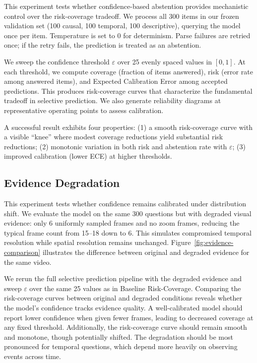 \documentclass{article}
\begin{document}
This experiment tests whether confidence-based abstention provides mechanistic control over the risk-coverage tradeoff. We process all 300 items in our frozen validation set (100 causal, 100 temporal, 100 descriptive), querying the model once per item. Temperature is set to 0 for determinism. Parse failures are retried once; if the retry fails, the prediction is treated as an abstention.

We sweep the confidence threshold $\varepsilon$ over 25 evenly spaced values in $[0, 1]$. At each threshold, we compute coverage (fraction of items answered), risk (error rate among answered items), and Expected Calibration Error among accepted predictions. This produces risk-coverage curves that characterize the fundamental tradeoff in selective prediction. We also generate reliability diagrams at representative operating points to assess calibration.

A successful result exhibits four properties: (1) a smooth risk-coverage curve with a visible ``knee'' where modest coverage reductions yield substantial risk reductions; (2) monotonic variation in both risk and abstention rate with $\varepsilon$; (3) improved calibration (lower ECE) at higher thresholds.

\subsection{Evidence Degradation}

This experiment tests whether confidence remains calibrated under distribution shift. We evaluate the model on the same 300 questions but with degraded visual evidence: only 6 uniformly sampled frames and no zoom frames, reducing the typical frame count from 15--18 down to 6. This simulates compromised temporal resolution while spatial resolution remains unchanged. Figure~\ref{fig:evidence-comparison} illustrates the difference between original and degraded evidence for the same video.

We rerun the full selective prediction pipeline with the degraded evidence and sweep $\varepsilon$ over the same 25 values as in Baseline Risk-Coverage. Comparing the risk-coverage curves between original and degraded conditions reveals whether the model's confidence tracks evidence quality. A well-calibrated model should report lower confidence when given fewer frames, leading to decreased coverage at any fixed threshold. Additionally, the risk-coverage curve should remain smooth and monotone, though potentially shifted. The degradation should be most pronounced for temporal questions, which depend more heavily on observing events across time.
\end{document}
